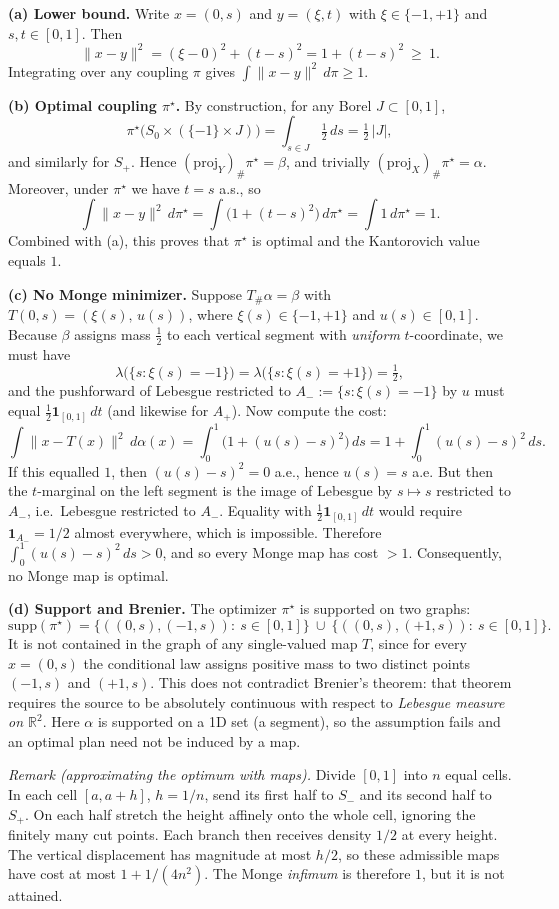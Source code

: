 \documentclass[11pt,a4paper]{article}
\theoremstyle{exostyle}
\newcommand{\R}{\mathbb{R}}
\newcommand{\push}{\#}
\begin{document}
\begin{solution}
\textbf{(a) Lower bound.}
Write $x=(0,s)$ and $y=(\xi,t)$ with $\xi\in\{-1,+1\}$ and $s,t\in[0,1]$.
Then
\[
\|x-y\|^2=(\xi-0)^2+(t-s)^2=1+(t-s)^2\ \ge\ 1.
\]
Integrating over any coupling $\pi$ gives $\int\|x-y\|^2\,d\pi\ge1$.

\medskip
\textbf{(b) Optimal coupling $\pi^\star$.}
By construction, for any Borel $J\subset[0,1]$,
\[
\pi^\star\big(S_0\times(\{-1\}\times J)\big)
=\int_{s\in J}\tfrac12\,ds=\tfrac12\,|J|,
\]
and similarly for $S_+$. Hence $(\mathrm{proj}_Y)_\push\pi^\star=\beta$, and trivially $(\mathrm{proj}_X)_\push\pi^\star=\alpha$.
Moreover, under $\pi^\star$ we have $t=s$ a.s., so
\[
\int \|x-y\|^2\,d\pi^\star
=\int \big(1+(t-s)^2\big)\,d\pi^\star
=\int 1\,d\pi^\star=1.
\]
Combined with (a), this proves that $\pi^\star$ is optimal and the Kantorovich value equals $1$.

\medskip
\textbf{(c) No Monge minimizer.}
Suppose $T_{\push}\alpha=\beta$ with $T(0,s)=(\xi(s),\,u(s))$, where $\xi(s)\in\{-1,+1\}$ and $u(s)\in[0,1]$.
Because $\beta$ assigns mass $\tfrac12$ to each vertical segment with \emph{uniform} $t$-coordinate, we must have
\[
\lambda\big(\{s:\xi(s)=-1\}\big)=\lambda\big(\{s:\xi(s)=+1\}\big)=\tfrac12,
\]
and the pushforward of Lebesgue restricted to $A_-:=\{s:\xi(s)=-1\}$ by $u$ must equal $\tfrac12\mathbf1_{[0,1]}\,dt$ (and likewise for $A_+$).
Now compute the cost:
\[
\int \|x-T(x)\|^2\,d\alpha(x)
=\int_{0}^{1} \big(1+(u(s)-s)^2\big)\,ds
=1+\int_{0}^{1}(u(s)-s)^2\,ds.
\]
If this equalled $1$, then $(u(s)-s)^2=0$ a.e., hence $u(s)=s$ a.e.
But then the $t$-marginal on the left segment is the image of Lebesgue by $s\mapsto s$ restricted to $A_-$, i.e.\ Lebesgue restricted to $A_-$. Equality with $\tfrac12\mathbf1_{[0,1]}\,dt$ would require $\mathbf1_{A_-}=1/2$ almost everywhere, which is impossible.
Therefore $\int_0^1(u(s)-s)^2\,ds>0$, and so every Monge map has cost $>1$.
Consequently, no Monge map is optimal.

\medskip
\textbf{(d) Support and Brenier.}
The optimizer $\pi^\star$ is supported on two graphs:
\[
\mathrm{supp}(\pi^\star)
=\big\{((0,s),(-1,s)):\ s\in[0,1]\big\}\ \cup\
\big\{((0,s),(+1,s)):\ s\in[0,1]\big\}.
\]
It is not contained in the graph of any single-valued map $T$, since for every $x=(0,s)$ the conditional law assigns positive mass to two distinct points $(-1,s)$ and $(+1,s)$.
This does not contradict Brenier's theorem: that theorem requires the source to be absolutely continuous with respect to \emph{Lebesgue measure on $\R^2$}.
Here $\alpha$ is supported on a 1D set (a segment), so the assumption fails and an optimal plan need not be induced by a map.

\smallskip
\emph{Remark (approximating the optimum with maps).}
Divide $[0,1]$ into $n$ equal cells. In each cell $[a,a+h]$,
$h=1/n$, send its first half to $S_-$ and its second half to $S_+$.
On each half stretch the height affinely onto the whole cell, ignoring
the finitely many cut points. Each branch then receives density $1/2$
at every height. The vertical displacement has magnitude at most $h/2$,
so these admissible maps have cost at most $1+1/(4n^2)$.
The Monge \emph{infimum} is therefore $1$, but it is not attained.
\end{solution}
\end{document}
